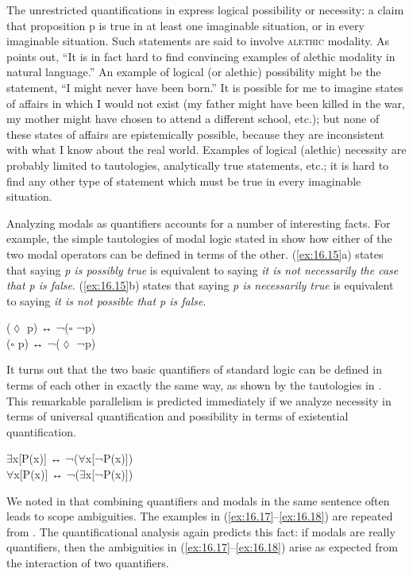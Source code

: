 The unrestricted quantifications in  express logical possibility or necessity: a claim that proposition p is true in at least one imaginable situation, or in every imaginable situation. Such statements are said to involve \textsc{alethic} modality. As  \citet{vonFintel2006} points out, “It is in fact hard to find convincing examples of alethic modality in natural language.” An example of logical (or alethic) possibility might be the statement, “I might never have been born.” It is possible for me to imagine states of affairs in which I would not exist (my father might have been killed in the war, my mother might have chosen to attend a different school, etc.); but none of these states of affairs are epistemically possible, because they are inconsistent with what I know about the real world. Examples of logical (alethic) necessity are probably limited to tautologies, analytically true statements, etc.; it is hard to find any other type of statement which must be true in every imaginable situation.



Analyzing modals as quantifiers accounts for a number of interesting facts. For example, the simple tautologies of modal logic stated in  show how either of the two modal operators can be defined in terms of the other. (\ref{ex:16.15}a) states that saying \textit{p is possibly true} is equivalent to saying \textit{it is not necessarily the case that p is false}. (\ref{ex:16.15}b) states that saying \textit{p is necessarily true} is equivalent to saying \textit{it is not possible that p is false}.


\ea \label{ex:16.15}
\ea    (${\lozenge}$ p)  ↔   ¬(${\square}$ ¬p)\\
\ex   (${\square}$ p)  ↔   ¬(${\lozenge}$ ¬p)
                       \z
\z


It turns out that the two basic quantifiers of standard logic can be defined in terms of each other in exactly the same way, as shown by the tautologies in . This remarkable parallelism is predicted immediately if we analyze necessity in terms of universal quantification and possibility in terms of existential quantification.


\ea \label{ex:16.16}
\ea    ${\exists}$x[P(x)]  ↔   ¬(${\forall}$x[¬P(x)])\\
\ex   ${\forall}$x[P(x)]  ↔   ¬(${\exists}$x[¬P(x)])
                       \z
\z


We noted in  that combining quantifiers and modals in the same sentence often leads to scope ambiguities. The examples in (\ref{ex:16.17}--\ref{ex:16.18}) are repeated from . The quantificational analysis again predicts this fact: if modals are really quantifiers, then the ambiguities in (\ref{ex:16.17}--\ref{ex:16.18}) arise as expected from the interaction of two quantifiers.


